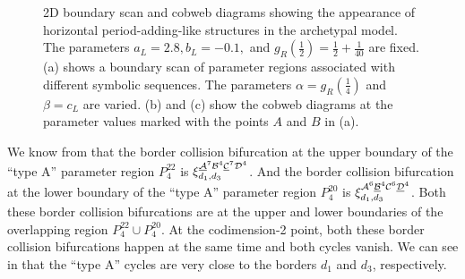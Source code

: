 \begin{figure}
	\centering
	\caption[2D boundary scan and cobweb diagrams showing the appearance of horizontal period-adding-like structures in the archetypal model]{
		2D boundary scan and cobweb diagrams showing the appearance of horizontal period-adding-like structures in the archetypal model.
		The parameters $a_L = 2.8, b_L = -0.1,$ and $g_R\left(\frac{1}{2}\right) = \frac{1}{2} + \frac{1}{40}$ are fixed.
		(a) shows a boundary scan of parameter regions associated with different symbolic sequences.
		The parameters $\alpha = g_R\left(\frac{1}{4}\right)$ and $\beta = c_L$ are varied.
		(b) and (c) show the cobweb diagrams at the parameter values marked with the points $A$ and $B$ in (a).
	}
\end{figure}

We know from  that the border collision bifurcation at the upper boundary of the ``type A'' parameter region $P^{22}_4$ is $\xi_{d_1, d_3}^{\underline{\mathcal{A}}^7\mathcal{B}^4\underline{\mathcal{C}}^7\mathcal{D}^4}$.
And the border collision bifurcation at the lower boundary of the ``type A'' parameter region $P^{20}_4$ is $\xi_{d_1, d_3}^{\mathcal{A}^6\underline{\mathcal{B}}^4\mathcal{C}^6\underline{\mathcal{D}}^4}$.
Both these border collision bifurcations are at the upper and lower boundaries of the overlapping region $P^{22}_4 \cup P^{20}_4$.
At the codimension-2 point, both these border collision bifurcations happen at the same time and both cycles vanish.
We can see in  that the ``type A'' cycles are very close to the borders $d_1$ and $d_3$, respectively.

